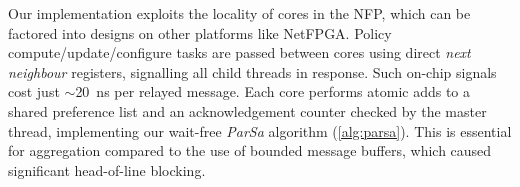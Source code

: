 %


Our implementation exploits the locality of cores in the NFP, which can be factored into designs on other platforms like NetFPGA.
Policy compute/update/configure tasks are passed between cores using direct \emph{next neighbour} registers, signalling all child threads in response.
Such on-chip signals cost just $\sim$\qty{20}{\nano\second} per relayed message.
Each core performs atomic adds to a shared preference list and an acknowledgement counter checked by the master thread, implementing our wait-free \emph{ParSa} algorithm (\cref{alg:parsa}).
This is essential for aggregation compared to the use of bounded message buffers, which caused significant head-of-line blocking.

%

